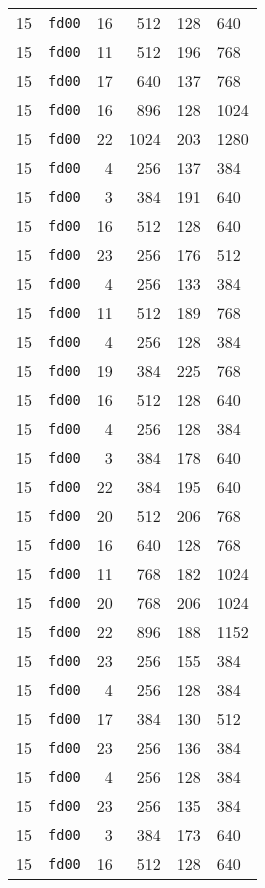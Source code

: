 \documentclass{article}
\begin{document}
\begin{table}[h!]
\begin{tabular}{llrrrl}
    15 & \texttt{fd00} & 16 & 512 & 128 & 640 \\
    15 & \texttt{fd00} & 11 & 512 & 196 & 768 \\
    15 & \texttt{fd00} & 17 & 640 & 137 & 768 \\
    15 & \texttt{fd00} & 16 & 896 & 128 & 1024 \\
    15 & \texttt{fd00} & 22 & 1024 & 203 & 1280 \\
    15 & \texttt{fd00} & 4 & 256 & 137 & 384 \\
    15 & \texttt{fd00} & 3 & 384 & 191 & 640 \\
    15 & \texttt{fd00} & 16 & 512 & 128 & 640 \\
    15 & \texttt{fd00} & 23 & 256 & 176 & 512 \\
    15 & \texttt{fd00} & 4 & 256 & 133 & 384 \\
    15 & \texttt{fd00} & 11 & 512 & 189 & 768 \\
    15 & \texttt{fd00} & 4 & 256 & 128 & 384 \\
    15 & \texttt{fd00} & 19 & 384 & 225 & 768 \\
    15 & \texttt{fd00} & 16 & 512 & 128 & 640 \\
    15 & \texttt{fd00} & 4 & 256 & 128 & 384 \\
    15 & \texttt{fd00} & 3 & 384 & 178 & 640 \\
    15 & \texttt{fd00} & 22 & 384 & 195 & 640 \\
    15 & \texttt{fd00} & 20 & 512 & 206 & 768 \\
    15 & \texttt{fd00} & 16 & 640 & 128 & 768 \\
    15 & \texttt{fd00} & 11 & 768 & 182 & 1024 \\
    15 & \texttt{fd00} & 20 & 768 & 206 & 1024 \\
    15 & \texttt{fd00} & 22 & 896 & 188 & 1152 \\
    15 & \texttt{fd00} & 23 & 256 & 155 & 384 \\
    15 & \texttt{fd00} & 4 & 256 & 128 & 384 \\
    15 & \texttt{fd00} & 17 & 384 & 130 & 512 \\
    15 & \texttt{fd00} & 23 & 256 & 136 & 384 \\
    15 & \texttt{fd00} & 4 & 256 & 128 & 384 \\
    15 & \texttt{fd00} & 23 & 256 & 135 & 384 \\
    15 & \texttt{fd00} & 3 & 384 & 173 & 640 \\
    15 & \texttt{fd00} & 16 & 512 & 128 & 640 \\

\end{tabular}
\end{table}
\end{document}
